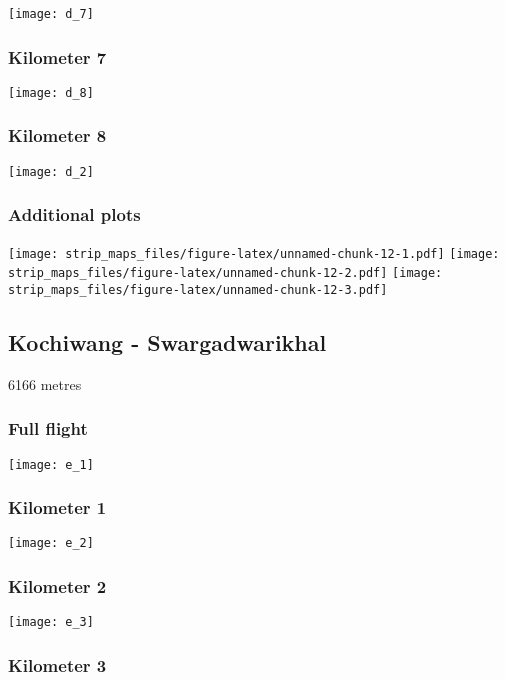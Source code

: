 \documentclass[]{article}
\begin{document}
\texttt{[image: d\_7]}

\subsubsection{Kilometer 7}\label{kilometer-7-2}

\texttt{[image: d\_8]}

\subsubsection{Kilometer 8}\label{kilometer-8-1}

\texttt{[image: d\_2]}

\subsubsection{Additional plots}\label{additional-plots-3}

\texttt{[image: strip\_maps\_files/figure-latex/unnamed-chunk-12-1.pdf]}
\texttt{[image: strip\_maps\_files/figure-latex/unnamed-chunk-12-2.pdf]}
\texttt{[image: strip\_maps\_files/figure-latex/unnamed-chunk-12-3.pdf]}

\newpage

\subsection{Kochiwang -
Swargadwarikhal}\label{kochiwang---swargadwarikhal}

6166 metres

\subsubsection{Full flight}\label{full-flight-4}

\texttt{[image: e\_1]}

\subsubsection{Kilometer 1}\label{kilometer-1-4}

\texttt{[image: e\_2]}

\subsubsection{Kilometer 2}\label{kilometer-2-4}

\texttt{[image: e\_3]}

\subsubsection{Kilometer 3}\label{kilometer-3-4}
\end{document}
